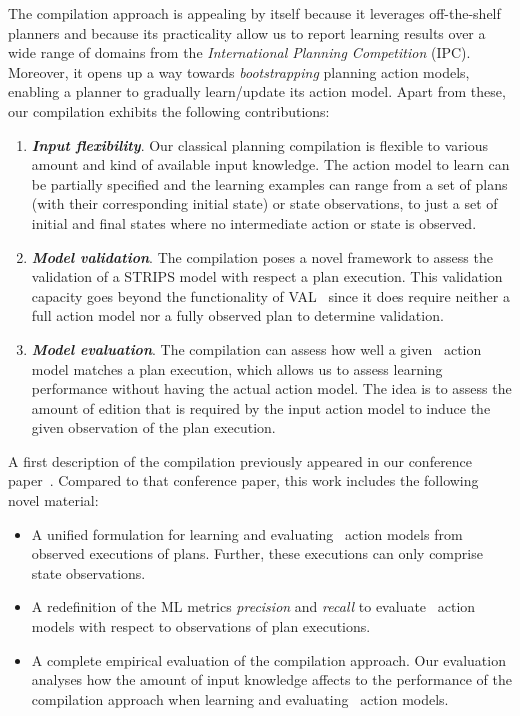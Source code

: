 The compilation approach is appealing by itself because it leverages off-the-shelf planners and because its practicality allow us to report learning results over a wide range of domains from the {\em International Planning Competition} (IPC). Moreover, it opens up a way towards \emph{bootstrapping} planning action models, enabling a planner to gradually learn/update its action model. Apart from these, our compilation exhibits the following contributions:
\begin{enumerate}
\item {\bf\em Input flexibility}. Our classical planning compilation is flexible to various amount and kind of available input knowledge. The action model to learn can be partially specified and the learning examples can range from a set of plans (with their corresponding initial state) or state observations, to just a set of initial and final states where no intermediate action or state is observed. %

\item {\bf\em Model validation}. The compilation poses a novel framework to assess the validation of a STRIPS model with respect a plan execution. This validation capacity goes beyond the functionality of VAL~\cite{howey2004val} since it does require neither a full action model nor a fully observed plan to determine validation. 
  
\item {\bf\em Model evaluation}. The compilation can assess how well a given \strips\ action model matches a plan execution, which allows us to assess learning performance without having the actual action model. The idea is to assess the amount of edition that is required by the input action model to induce the given observation of the plan execution. 
\end{enumerate}

A first description of the compilation previously appeared in our conference paper~\cite{aineto2018learning}. Compared to that conference paper, this work includes the following novel material:
\begin{itemize}
\item A unified formulation for learning and evaluating \strips\ action models from observed executions of plans. Further, these executions can only comprise state observations.
\item A redefinition of the ML metrics {\em precision} and {\em recall} to evaluate \strips\ action models with respect to observations of plan executions.
\item A complete empirical evaluation of the compilation approach. Our evaluation analyses how the amount of input knowledge affects to the performance of the compilation approach when learning and evaluating \strips\ action models. 
\end{itemize}

